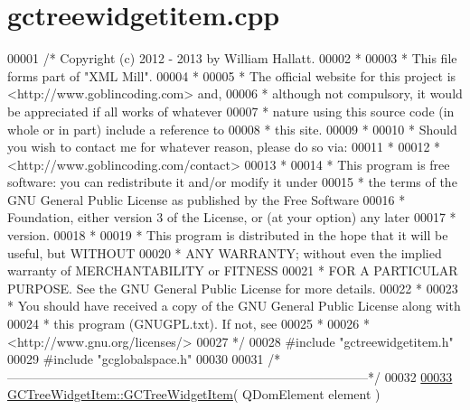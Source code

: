 \hypertarget{gctreewidgetitem_8cpp_source}{\section{gctreewidgetitem.\-cpp}
}

\begin{DoxyCode}
00001 \textcolor{comment}{/* Copyright (c) 2012 - 2013 by William Hallatt.}
00002 \textcolor{comment}{ *}
00003 \textcolor{comment}{ * This file forms part of "XML Mill".}
00004 \textcolor{comment}{ *}
00005 \textcolor{comment}{ * The official website for this project is <http://www.goblincoding.com> and,}
00006 \textcolor{comment}{ * although not compulsory, it would be appreciated if all works of whatever}
00007 \textcolor{comment}{ * nature using this source code (in whole or in part) include a reference to}
00008 \textcolor{comment}{ * this site.}
00009 \textcolor{comment}{ *}
00010 \textcolor{comment}{ * Should you wish to contact me for whatever reason, please do so via:}
00011 \textcolor{comment}{ *}
00012 \textcolor{comment}{ *                 <http://www.goblincoding.com/contact>}
00013 \textcolor{comment}{ *}
00014 \textcolor{comment}{ * This program is free software: you can redistribute it and/or modify it
       under}
00015 \textcolor{comment}{ * the terms of the GNU General Public License as published by the Free
       Software}
00016 \textcolor{comment}{ * Foundation, either version 3 of the License, or (at your option) any later}
00017 \textcolor{comment}{ * version.}
00018 \textcolor{comment}{ *}
00019 \textcolor{comment}{ * This program is distributed in the hope that it will be useful, but WITHOUT}
00020 \textcolor{comment}{ * ANY WARRANTY; without even the implied warranty of MERCHANTABILITY or
       FITNESS}
00021 \textcolor{comment}{ * FOR A PARTICULAR PURPOSE.  See the GNU General Public License for more
       details.}
00022 \textcolor{comment}{ *}
00023 \textcolor{comment}{ * You should have received a copy of the GNU General Public License along with}
00024 \textcolor{comment}{ * this program (GNUGPL.txt).  If not, see}
00025 \textcolor{comment}{ *}
00026 \textcolor{comment}{ *                    <http://www.gnu.org/licenses/>}
00027 \textcolor{comment}{ */}
00028 \textcolor{preprocessor}{#include "gctreewidgetitem.h"}
00029 \textcolor{preprocessor}{#include "gcglobalspace.h"}
00030 
00031 \textcolor{comment}{/*
      --------------------------------------------------------------------------------------*/}
00032 
\hypertarget{gctreewidgetitem_8cpp_source_l00033}{}\hyperlink{class_g_c_tree_widget_item_ab8ffe3b11f00edd90397b885bb58d4a4}{00033} \hyperlink{class_g_c_tree_widget_item_ab8ffe3b11f00edd90397b885bb58d4a4}{GCTreeWidgetItem::GCTreeWidgetItem}( QDomElement element )

\end{DoxyCode}
